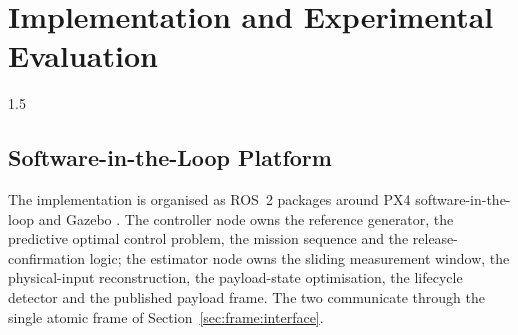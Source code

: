 
\chapter{Implementation and Experimental Evaluation}
\label{ch:evaluation}
\begin{spacing}{1.5}
\setlength{\parskip}{0.22in}

\section{Software-in-the-Loop Platform}\label{sec:eval:platform}

The implementation is organised as ROS~2 packages around PX4
software-in-the-loop \cite{px4} and Gazebo \cite{gazebo}. The controller node
owns the reference generator, the predictive optimal control problem, the mission
sequence and the release-confirmation logic; the estimator node owns the sliding
measurement window, the physical-input reconstruction, the payload-state
optimisation, the lifecycle detector and the published payload frame. The two
communicate through the single atomic frame of
Section~\ref{sec:frame:interface}.


\end{spacing}
